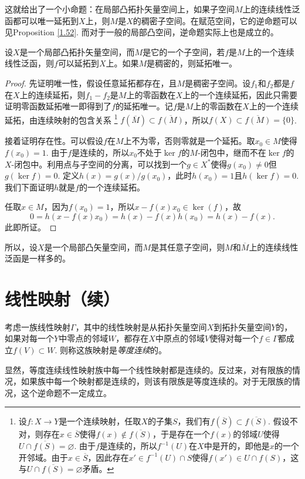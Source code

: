这就给出了一个小命题：在局部凸拓扑矢量空间上，如果子空间$M$上的连续线性泛函都可以唯一延拓到$X$上，则$M$是$X$的稠密子空间。在赋范空间，它的逆命题可以见Proposition \ref{1.52}. 而对于一般的局部凸空间，逆命题实际上也是成立的。

\begin{pro}
设$X$是一个局部凸拓扑矢量空间，而$M$是它的一个子空间，若$f$是$M$上的一个连续线性泛函，则$f$可以延拓到$X$上。如果$M$是稠密的，则延拓唯一。
\end{pro}

\begin{proof}
	先证明唯一性，假设任意延拓都存在，且$M$是稠密子空间。设$f_1$和$f_2$都是$f$在$X$上的连续延拓，则$f_1-f_2$是$M$上的零函数在$X$上的一个连续延拓，因此只需要证明零函数延拓唯一即得到了$f$的延拓唯一。记$f$是$M$上的零函数在$X$上的一个连续延拓，由连续映射的包含关系
	\footnote{设$f:X\to Y$是一个连续映射，任取$X$的子集$S$，我们有$f(\overline{S})\subset \overline{f(S)}$. 假设不对，则存在$x\in \overline{S}$使得$f(x)\not\in \overline{f(S)}$，于是存在一个$f(x)$的邻域$U$使得$U\cap \overline{f(S)}=\varnothing$. 由于$f$是连续的，所以$f^{-1}(U)$在$X$中是开的，即他是$x$的一个开邻域。由于$x\in \overline{S}$，因此存在$x'\in f^{-1}(U)\cap S$使得$f(x')\in U\cap f(S)$，这与$U\cap \overline{f(S)}=\varnothing$矛盾。}
	$f(\overline{M})\subset \overline{f(M)}$，所以$f(X)\subset\overline{f(M)}=\{0\}$.

	接着证明存在性。可以假设$f$在$M$上不为零，否则零就是一个延拓。取$x_0\in M$使得$f(x_0)=1$. 由于$f$是连续的，所以$x_0$不处于$\ker f$的$M$-闭包中，继而不在$\ker f$的$X$-闭包中。利用点与子空间的分离，可以找到一个$g\in X^*$使得$g(x_0)\neq 0$但$g(\ker f)=0$. 定义$h(x)=g(x)/g(x_0)$，此时$h(x_0)=1$且$h(\ker f)=0$. 我们下面证明$h$就是$f$的一个连续延拓。

	任取$x\in M$，因为$f(x_0)=1$，所以$x-f(x)x_0\in \ker(f)$，故
	\[
		0=h(x-f(x)x_0)=h(x)-f(x)h(x_0)=h(x)-f(x).
	\]
	此即所证。
\end{proof}

所以，设$X$是一个局部凸矢量空间，而$M$是其任意子空间，则$M$和$\overline{M}$上的连续线性泛函是一样多的。

\section{线性映射（续）}

\begin{para}
	考虑一族线性映射$\Gamma$，其中的线性映射是从拓扑矢量空间$X$到拓扑矢量空间$Y$的，如果对每一个$Y$中零点的邻域$W$，都存在$X$中原点的邻域$V$使得对每一个$f\in \Gamma$都成立$f(V)\subset W$. 则称这族映射是\textit{等度连续}的。

	显然，等度连续线性映射族中每一个线性映射都是连续的。反过来，对有限族的情况，如果族中每一个映射都是连续的，则该有限族是等度连续的。对于无限族的情况，这个逆命题不一定成立。
\end{para}

